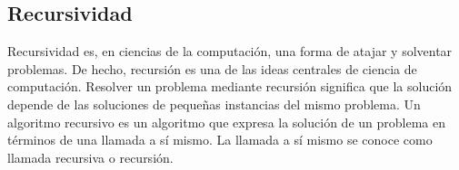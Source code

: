 \subsection{Recursividad}
Recursividad es, en ciencias de la computación, una forma de atajar y solventar problemas. De hecho, 
recursión es una de las ideas centrales de ciencia de computación. Resolver un problema mediante 
recursión significa que la solución depende de las soluciones de pequeñas instancias del mismo problema. 
Un algoritmo recursivo es un algoritmo que expresa la solución de un problema en términos de una llamada 
a sí mismo. La llamada a sí mismo se conoce como llamada recursiva o recursión. 